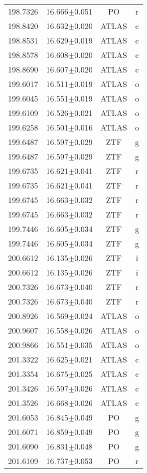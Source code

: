 \begin{table}
\begin{tabular}{cccc}
198.7326 & 16.666$\pm$0.051 & PO & r \\
198.8420 & 16.632$\pm$0.020 & ATLAS & c \\
198.8531 & 16.629$\pm$0.019 & ATLAS & c \\
198.8578 & 16.608$\pm$0.020 & ATLAS & c \\
198.8690 & 16.607$\pm$0.020 & ATLAS & c \\
199.6017 & 16.511$\pm$0.019 & ATLAS & o \\
199.6045 & 16.551$\pm$0.019 & ATLAS & o \\
199.6109 & 16.526$\pm$0.021 & ATLAS & o \\
199.6258 & 16.501$\pm$0.016 & ATLAS & o \\
199.6487 & 16.597$\pm$0.029 & ZTF & g \\
199.6487 & 16.597$\pm$0.029 & ZTF & g \\
199.6735 & 16.621$\pm$0.041 & ZTF & r \\
199.6735 & 16.621$\pm$0.041 & ZTF & r \\
199.6745 & 16.663$\pm$0.032 & ZTF & r \\
199.6745 & 16.663$\pm$0.032 & ZTF & r \\
199.7446 & 16.605$\pm$0.034 & ZTF & g \\
199.7446 & 16.605$\pm$0.034 & ZTF & g \\
200.6612 & 16.135$\pm$0.026 & ZTF & i \\
200.6612 & 16.135$\pm$0.026 & ZTF & i \\
200.7326 & 16.673$\pm$0.040 & ZTF & r \\
200.7326 & 16.673$\pm$0.040 & ZTF & r \\
200.8926 & 16.569$\pm$0.024 & ATLAS & o \\
200.9607 & 16.558$\pm$0.026 & ATLAS & o \\
200.9866 & 16.551$\pm$0.035 & ATLAS & o \\
201.3322 & 16.625$\pm$0.021 & ATLAS & c \\
201.3354 & 16.675$\pm$0.025 & ATLAS & c \\
201.3426 & 16.597$\pm$0.026 & ATLAS & c \\
201.3526 & 16.668$\pm$0.026 & ATLAS & c \\
201.6053 & 16.845$\pm$0.049 & PO & g \\
201.6071 & 16.859$\pm$0.049 & PO & g \\
201.6090 & 16.831$\pm$0.048 & PO & g \\
201.6109 & 16.737$\pm$0.053 & PO & r \\

\end{tabular}
\end{table}
